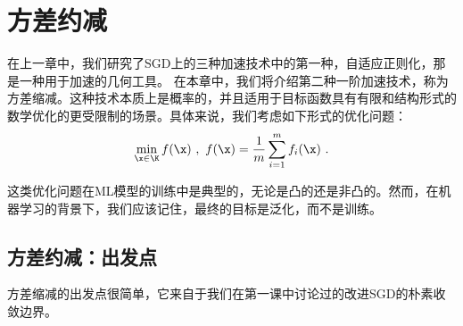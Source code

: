 \chapter{
    方差约减
    }  \label{chapter:variancereduction}


在上一章中，我们研究了SGD上的三种加速技术中的第一种，自适应正则化，那是一种用于加速的几何工具。
在本章中，我们将介绍第二种一阶加速技术，称为方差缩减。这种技术本质上是概率的，并且适用于目标函数具有有限和结构形式的数学优化的更受限制的场景。具体来说，我们考虑如下形式的优化问题：
\begin{equation}
\min_{\x \in \K} f(\x) \ , \  f(\x) = \frac{1}{m} \sum_{i=1}^m f_i(\x) \ .  \label{eqn:ERM}
\end{equation}

这类优化问题在ML模型的训练中是典型的，无论是凸的还是非凸的。然而，在机器学习的背景下，我们应该记住，最终的目标是泛化，而不是训练。



\section{
    方差约减：出发点
    }

方差缩减的出发点很简单，它来自于我们在第一课中讨论过的改进SGD的朴素收敛边界。


